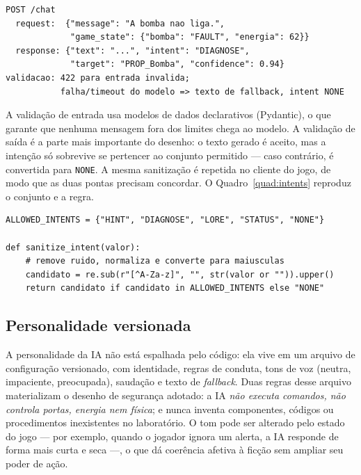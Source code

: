 \begin{quadro}[htbp]
\centering
\caption{Contrato de dados do adaptador de IA (resumo).}
\label{quad:contrato}
\begin{verbatim}
POST /chat
  request:  {"message": "A bomba nao liga.",
             "game_state": {"bomba": "FAULT", "energia": 62}}
  response: {"text": "...", "intent": "DIAGNOSE",
             "target": "PROP_Bomba", "confidence": 0.94}
validacao: 422 para entrada invalida;
           falha/timeout do modelo => texto de fallback, intent NONE
\end{verbatim}
\par\vspace{2pt}{\footnotesize Fonte: elaborado pelo autor (2026), a partir do adaptador do projeto.}
\end{quadro}

A validação de entrada usa modelos de dados declarativos (Pydantic), o que
garante que nenhuma mensagem fora dos limites chega ao modelo. A validação de
saída é a parte mais importante do desenho: o texto gerado é aceito, mas a
intenção só sobrevive se pertencer ao conjunto permitido --- caso contrário,
é convertida para \texttt{NONE}. A mesma sanitização é repetida no cliente do
jogo, de modo que as duas pontas precisam concordar. O
Quadro~\ref{quad:intents} reproduz o conjunto e a regra.

\begin{quadro}[htbp]
\centering
\caption{Conjunto de intenções permitidas e regra de sanitização (adaptador).}
\label{quad:intents}
\begin{verbatim}
ALLOWED_INTENTS = {"HINT", "DIAGNOSE", "LORE", "STATUS", "NONE"}

def sanitize_intent(valor):
    # remove ruido, normaliza e converte para maiusculas
    candidato = re.sub(r"[^A-Za-z]", "", str(valor or "")).upper()
    return candidato if candidato in ALLOWED_INTENTS else "NONE"
\end{verbatim}
\par\vspace{2pt}{\footnotesize Fonte: elaborado pelo autor (2026), a partir do código do adaptador.}
\end{quadro}

\subsection{Personalidade versionada}
\label{sec:personalidade}

A personalidade da IA não está espalhada pelo código: ela vive em um arquivo
de configuração versionado, com identidade, regras de conduta, tons de voz
(neutra, impaciente, preocupada), saudação e texto de \emph{fallback}. Duas
regras desse arquivo materializam o desenho de segurança adotado: a IA
\emph{não executa comandos, não controla portas, energia nem física}; e nunca
inventa componentes, códigos ou procedimentos inexistentes no laboratório.
O tom pode ser alterado pelo estado do jogo --- por exemplo, quando o jogador
ignora um alerta, a IA responde de forma mais curta e seca ---, o que dá
coerência afetiva à ficção sem ampliar seu poder de ação.

